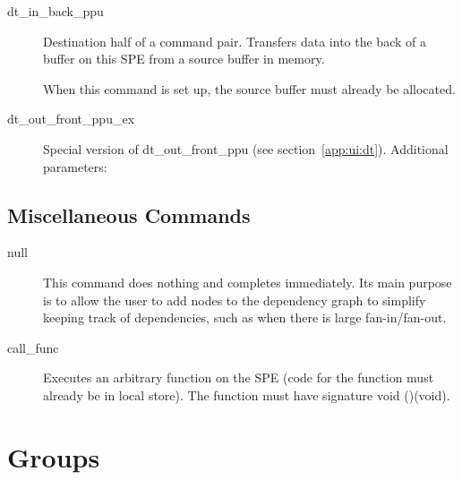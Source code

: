 \begin{description}
\item[\textsf{dt\_in\_back\_ppu}] Destination half of a command pair. Transfers data into the back of a buffer on this SPE from a source buffer in memory.

When this command is set up, the source buffer must already be allocated.

\item[\textsf{dt\_out\_front\_ppu\_ex}] Special version of \textsf{dt\_out\_front\_ppu} (see section~\ref{app:ui:dt}). Additional parameters:

\end{description}

\subsection{Miscellaneous Commands}

\begin{description}
\item[\textsf{null}] This command does nothing and completes immediately. Its main purpose is to allow the user to add nodes to the dependency graph to simplify keeping track of dependencies, such as when there is large fan-in/fan-out.

\item[\textsf{call\_func}] Executes an arbitrary function on the SPE (code for the function must already be in local store). The function must have signature \textsf{void ()(void)}.

\end{description}

\section{Groups}\label{app:ui:groups}

